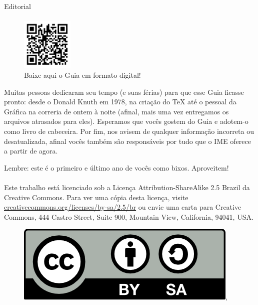 \begin{editorial}{Editorial}
\paragraph{}
\begin{figure}
  \vspace{-30pt}
  \begin{center}
    \includegraphics[width=0.22\textwidth]{img/qrcode.pdf}
  \end{center}
  \vspace{-20pt}
  \caption{Baixe aqui o Guia em formato digital!}
  \vspace{-30pt}
\end{figure}
Muitas pessoas dedicaram seu tempo (e suas férias) para que esse Guia ficasse pronto: desde o
Donald Knuth em 1978, na criação do \TeX\makebox{} até o pessoal da Gráfica na correria de
ontem à noite (afinal, mais uma vez entregamos os arquivos atrasados para eles).
Esperamos que vocês gostem do Guia e adotem-o como livro de cabeceira. Por fim,
nos avisem de qualquer informação incorreta ou desatualizada, afinal vocês também são
responsáveis por tudo que o IME oferece a partir de agora.

Lembre: este é o primeiro e último ano de vocês como bixos. Aproveitem!



\paragraph{}
Este trabalho está licenciado sob a Licença Attribution-ShareAlike 2.5 Brazil
da Creative Commons. Para ver uma cópia desta licença,
visite \url{creativecommons.org/licenses/by-sa/2.5/br} ou envie uma
carta para Creative Commons, 444 Castro Street, Suite 900, Mountain View,
California, 94041, USA.
\\
\begin{figure}[H]
    \centering
    \includegraphics{img/cc/by-sa.png},
\end{figure}

\thispagestyle{empty}
\pagebreak
\end{editorial}

